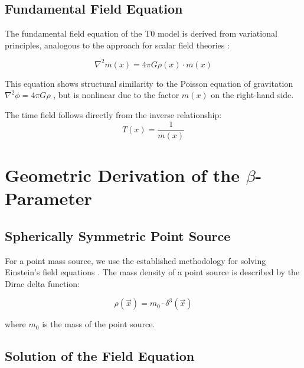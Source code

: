 \documentclass[12pt,a4paper]{article}
\begin{document}
	\subsection{Fundamental Field Equation}
	\label{subsec:field_equation}
	
	The fundamental field equation of the T0 model is derived from variational principles, analogous to the approach for scalar field theories \citep{weinberg1995}:
	
	\begin{equation}
		\label{eq:field_equation_fundamental}
		\nabla^2 m(x) = 4\pi G \rho(x) \cdot m(x)
	\end{equation}
	
	This equation shows structural similarity to the Poisson equation of gravitation $\nabla^2 \phi = 4\pi G \rho$ \citep{jackson1998}, but is nonlinear due to the factor $m(x)$ on the right-hand side.
	
	The time field follows directly from the inverse relationship:
	\begin{equation}
		\label{eq:time_field_definition}
		T(x) = \frac{1}{m(x)}
	\end{equation}
	
	\section{Geometric Derivation of the $\beta$-Parameter}
	\label{sec:beta_derivation}
	
	\subsection{Spherically Symmetric Point Source}
	\label{subsec:spherical_solution}
	
	For a point mass source, we use the established methodology for solving Einstein's field equations \citep{schwarzschild1916,misner1973}. The mass density of a point source is described by the Dirac delta function:
	
	\begin{equation}
		\rho(\vec{x}) = m_0 \cdot \delta^3(\vec{x})
	\end{equation}
	
	where $m_0$ is the mass of the point source.
	
	\subsection{Solution of the Field Equation}
	\label{subsec:field_solution}
	
\end{document}
